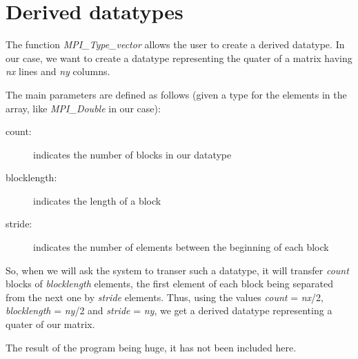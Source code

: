 \chapter{Derived datatypes}

The function \textit{MPI\_Type\_vector} allows the user to create a derived datatype. In our case, we want to create a datatype representing the quater of a matrix having \textit{nx} lines and \textit{ny} columns.

The main parameters are defined as follows (given a type for the elements in the array, like \textit{MPI\_Double} in our case):
\begin{description}
	\item[count:] indicates the number of blocks in our datatype
	\item[blocklength:] indicates the length of a block
	\item[stride:] indicates the number of elements between the beginning of each block
\end{description}
So, when we will ask the system to transer such a datatype, it will transfer \textit{count} blocks of \textit{blocklength} elements, the first element of each block being separated from the next one by \textit{stride} elements. Thus, using the values \textit{count} = \textit{nx}/2, \textit{blocklength} = \textit{ny}/2 and \textit{stride} = \textit{ny}, we get a derived datatype representing a quater of our matrix.

The result of the program being huge, it has not been included here.

